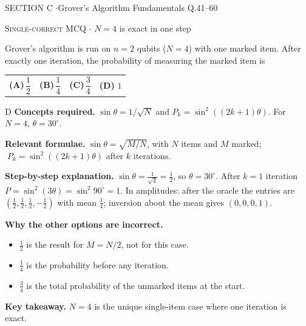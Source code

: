 \documentclass[11pt,a4paper]{article}
\newcommand{\optlabel}[1]{\textbf{(#1)}}
\newcommand{\correctlabel}[1]{\textcolor{okgreen}{\textbf{(#1)}\,\ding{51}}}
\newenvironment{qitem}[1]{\begin{list}{}{\setlength{\leftmargin}{3.3em}\setlength{\labelwidth}{3.1em}%
  \setlength{\labelsep}{0.2em}\setlength{\topsep}{3pt}\setlength{\parsep}{3pt}}\item[\textbf{Q.#1}\hfill]}{\end{list}}
\newcommand{\qsep}{\par\vspace{2pt}{\color{black!15}\hrule}\vspace{4pt}}
\newcommand{\qmeta}[2]{{\footnotesize\color{black!60}\textsc{#1} \;$\cdot$\; #2}\par}
\begin{document}
\newpage

\begin{sectionbanner}SECTION C \enspace$\cdot$\enspace Grover's Algorithm Fundamentals \hfill Q.41--60\end{sectionbanner}

\begin{qitem}{41}
\qmeta{Single-correct MCQ}{$N = 4$ is exact in one step}
Grover's algorithm is run on $n = 2$ qubits ($N = 4$) with one marked item. After exactly one iteration, the probability of measuring the marked item is
\par\smallskip\noindent\begin{tabularx}{\linewidth}{@{}*{4}{L}@{}}
\optlabel{A}\,$\dfrac12$ & \optlabel{B}\,$\dfrac14$ & \optlabel{C}\,$\dfrac34$ & \correctlabel{D}\,$1$
\end{tabularx}
\end{qitem}
\begin{solbox}{D}
\textbf{\color{brand}Concepts required.} $\sin\theta = 1/\sqrt N$ and $P_k = \sin^2((2k+1)\theta)$. For $N = 4$, $\theta = 30^\circ$.

\textbf{\color{brand}Relevant formulae.} $\sin\theta = \sqrt{M/N}$, with $N$ items and $M$ marked; $\;P_k = \sin^2((2k+1)\theta)$ after $k$ iterations.

\textbf{\color{brand}Step-by-step explanation.} $\sin\theta = \frac{1}{\sqrt4} = \frac12$, so $\theta = 30^\circ$. After $k = 1$ iteration $P = \sin^2(3\theta) = \sin^2 90^\circ = 1$.
In amplitudes: after the oracle the entries are $(\frac12, \frac12, \frac12, -\frac12)$ with mean $\frac14$; inversion about the mean gives $(0, 0, 0, 1)$.

\textbf{\color{brand}Why the other options are incorrect.}
\begin{itemize}[leftmargin=2.4em, itemsep=1pt, topsep=2pt]
\item[\textbf{(A)}] $\frac12$ is the result for $M = N/2$, not for this case.
\item[\textbf{(B)}] $\frac14$ is the probability before any iteration.
\item[\textbf{(C)}] $\frac34$ is the total probability of the unmarked items at the start.
\end{itemize}
\textbf{\color{brand}Key takeaway.} $N = 4$ is the unique single-item case where one iteration is exact.
\end{solbox}
\qsep
\end{document}
